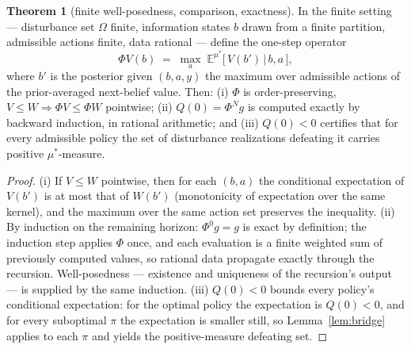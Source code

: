 \documentclass[10pt,twocolumn]{article}
\theoremstyle{definition}
\newtheorem{theorem}{Theorem}
\begin{document}
\begin{theorem}[finite well-posedness, comparison, exactness]
\label{thm:envelope-finite}
In the finite setting --- disturbance set $\Omega$ finite, information
states $b$ drawn from a finite partition, admissible actions finite, data
rational --- define the one-step operator
\[
\Phi V(b) \;=\; \max_{a}\; \mathbb{E}^{\mu^{*}}\bigl[\, V(b') \,\big|\, b, a \,\bigr],
\]
where $b'$ is the posterior given $(b, a, y)$
the maximum over admissible actions of the prior-averaged next-belief
value. Then: (i) $\Phi$ is order-preserving,
$V \le W \Rightarrow \Phi V \le \Phi W$ pointwise; (ii)
$Q(0) = \Phi^{N} g$ is computed exactly by backward induction, in rational
arithmetic; and (iii) $Q(0) < 0$ certifies that for every admissible policy
the set of disturbance realizations defeating it carries positive
$\mu^{*}$-measure.
\end{theorem}
\begin{proof}
(i) If $V \le W$ pointwise, then for each $(b, a)$ the conditional
expectation of $V(b')$ is at most that of $W(b')$ (monotonicity of
expectation over the same kernel), and the maximum over the same action set
preserves the inequality. (ii) By induction on the remaining horizon:
$\Phi^{0} g = g$ is exact by definition; the induction step applies $\Phi$
once, and each evaluation is a finite weighted sum of previously computed
values, so rational data propagate exactly through the recursion.
Well-posedness --- existence and uniqueness of the recursion's output ---
is supplied by the same induction. (iii) $Q(0) < 0$ bounds every policy's
conditional expectation: for the optimal policy the expectation is
$Q(0) < 0$, and for every suboptimal $\pi$ the expectation is smaller
still, so Lemma~\ref{lem:bridge} applies to each $\pi$ and yields the
positive-measure defeating set.
\end{proof}
\end{document}
